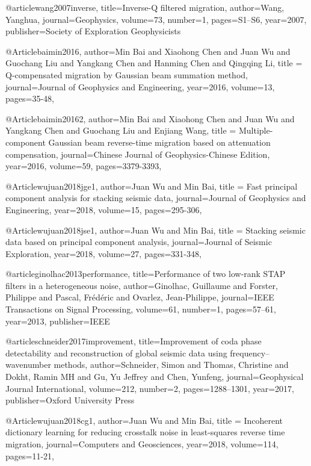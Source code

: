@article{wang2007inverse,
  title={Inverse-{Q} filtered migration},
  author={Wang, Yanghua},
  journal={Geophysics},
  volume={73},
  number={1},
  pages={S1--S6},
  year={2007},
  publisher={Society of Exploration Geophysicists}
}

@Article{baimin2016,
  author={Min Bai and Xiaohong Chen and Juan Wu and Guochang Liu and Yangkang Chen and Hanming Chen and Qingqing Li},
  title = {Q-compensated migration by Gaussian beam summation method},
  journal={Journal of Geophysics and Engineering},
  year=2016,
  volume=13,
  pages={35-48},
}


@Article{baimin20162,
  author={Min Bai and Xiaohong Chen and Juan Wu and Yangkang Chen and Guochang Liu and  Enjiang Wang},
  title = {Multiple-component Gaussian beam reverse-time migration based on attenuation compensation},
  journal={Chinese Journal of Geophysics-Chinese Edition},
  year=2016,
  volume=59,
  pages={3379-3393},
}

@Article{wujuan2018jge1,
  author={Juan Wu and Min Bai},
  title = {Fast principal component analysis for stacking seismic data},
  journal={Journal of Geophysics and Engineering},
  year=2018,
  volume=15,
  pages={295-306},
}

@Article{wujuan2018jse1,
  author={Juan Wu and Min Bai},
  title = {Stacking seismic data based on principal component analysis},
  journal={Journal of Seismic Exploration},
  year=2018,
  volume=27,
  pages={331-348},
}

@article{ginolhac2013performance,
  title={Performance of two low-rank STAP filters in a heterogeneous noise},
  author={Ginolhac, Guillaume and Forster, Philippe and Pascal, Fr{\'e}d{\'e}ric and Ovarlez, Jean-Philippe},
  journal={IEEE Transactions on Signal Processing},
  volume={61},
  number={1},
  pages={57--61},
  year={2013},
  publisher={IEEE}
}


@article{schneider2017improvement,
  title={Improvement of coda phase detectability and reconstruction of global seismic data using frequency--wavenumber methods},
  author={Schneider, Simon and Thomas, Christine and Dokht, Ramin MH and Gu, Yu Jeffrey and Chen, Yunfeng},
  journal={Geophysical Journal International},
  volume={212},
  number={2},
  pages={1288--1301},
  year={2017},
  publisher={Oxford University Press}
}


@Article{wujuan2018cg1,
  author={Juan Wu and Min Bai},
  title = {Incoherent dictionary learning for reducing crosstalk noise in least-squares reverse time migration},
  journal={Computers and Geosciences},
  year=2018,
  volume=114,
  pages={11-21},
}

